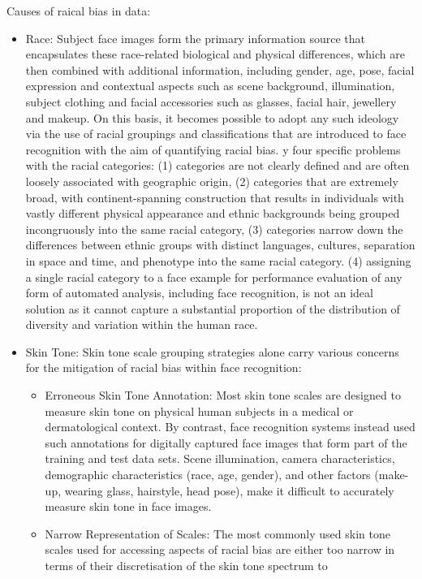 \documentclass[12pt]{article}
\begin{document}
Causes of raical bias in data:
\begin{itemize}
  \item Race: Subject face images form the primary information source that encapsulates these race-related
  biological and physical differences, which are then combined with additional information, including gender, age, pose,
  facial expression and contextual aspects such as scene background, illumination, subject clothing and facial accessories
  such as glasses, facial hair, jewellery and makeup. On this basis, it becomes possible to adopt any such ideology via the
  use of racial groupings and classifications that are introduced to face recognition with the aim of quantifying racial bias. y four specific problems with the racial categories: (1) categories are not clearly defined
  and are often loosely associated with geographic origin, (2) categories that are extremely broad, with continent-spanning
  construction that results in individuals with vastly different physical appearance and ethnic backgrounds being grouped
  incongruously into the same racial category, (3) categories narrow down the differences between ethnic groups with
  distinct languages, cultures, separation in space and time, and phenotype into the same racial category. (4) assigning a
  single racial category to a face example for performance evaluation of any form of automated analysis, including face
  recognition, is not an ideal solution as it cannot capture a substantial proportion of the distribution of diversity and
  variation within the human race.
  \item Skin Tone: Skin tone scale grouping strategies alone carry various concerns for the mitigation of
  racial bias within face recognition:
  \begin{itemize}
    \item Erroneous Skin Tone Annotation: Most skin tone scales are designed to measure skin tone on physical human
    subjects in a medical or dermatological context. By contrast, face recognition systems instead used such annotations for
    digitally captured face images that form part of the training and test data sets. Scene illumination, camera characteristics, demographic characteristics (race, age,
    gender), and other factors (make-up, wearing glass, hairstyle, head pose), make it difficult to accurately measure skin tone in face images.
    \item Narrow Representation of Scales: The most commonly used skin tone scales used for accessing aspects of racial
    bias are either too narrow in terms of their discretisation of the skin tone spectrum to

\end{itemize}
\end{itemize}
\end{document}
